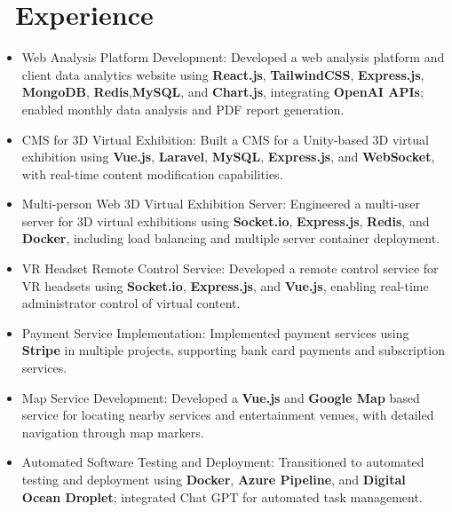 \documentclass{resume}
\begin{document}
\section{\faUsers\ Experience}
\begin{itemize}[noitemsep]
  \item Web Analysis Platform Development: Developed a web analysis platform and client data analytics website using \textbf{React.js}, \textbf{TailwindCSS}, \textbf{Express.js}, \textbf{MongoDB}, \textbf{Redis},\textbf{MySQL}, and \textbf{Chart.js}, integrating \textbf{OpenAI APIs}; enabled monthly data analysis and PDF report generation.
  \item CMS for 3D Virtual Exhibition: Built a CMS for a Unity-based 3D virtual exhibition using \textbf{Vue.js}, \textbf{Laravel}, \textbf{MySQL}, \textbf{Express.js}, and \textbf{WebSocket}, with real-time content modification capabilities.
  \item Multi-person Web 3D Virtual Exhibition Server: Engineered a multi-user server for 3D virtual exhibitions using \textbf{Socket.io}, \textbf{Express.js}, \textbf{Redis}, and \textbf{Docker}, including load balancing and multiple server container deployment.
  \item VR Headset Remote Control Service: Developed a remote control service for VR headsets using \textbf{Socket.io}, \textbf{Express.js}, and \textbf{Vue.js}, enabling real-time administrator control of virtual content.
  \item Payment Service Implementation: Implemented payment services using \textbf{Stripe} in multiple projects, supporting bank card payments and subscription services.
  \item Map Service Development: Developed a \textbf{Vue.js} and \textbf{Google Map} based service for locating nearby services and entertainment venues, with detailed navigation through map markers.
  \item Automated Software Testing and Deployment: Transitioned to automated testing and deployment using \textbf{Docker}, \textbf{Azure Pipeline}, and \textbf{Digital Ocean Droplet}; integrated Chat GPT for automated task management.
\end{itemize}
\end{document}
